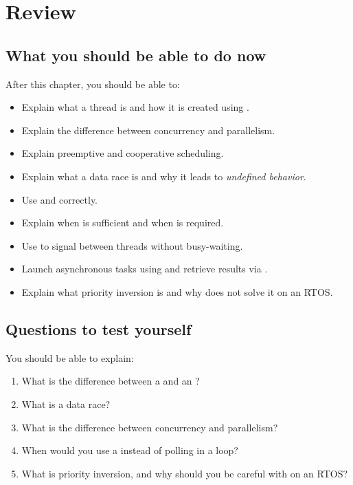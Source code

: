 
\section{Review}
\label{c6:sec:review}

\subsection*{What you should be able to do now}
After this chapter, you should be able to:
\begin{itemize}
  \item Explain what a thread is and how it is created using .
  \item Explain the difference between concurrency and parallelism.
  \item Explain preemptive and cooperative scheduling.
  \item Explain what a data race is and why it leads to \emph{undefined behavior}.
  \item Use  and  correctly.
  \item Explain when  is sufficient and when  is required.
  \item Use  to signal between threads without busy-waiting.
  \item Launch asynchronous tasks using  and retrieve results via
    .
  \item Explain what priority inversion is and why  does not solve it on an RTOS.
\end{itemize}

\subsection*{Questions to test yourself}
You should be able to explain:
\begin{enumerate}
  \item What is the difference between a  and an ?
  \item What is a data race?
  \item What is the difference between concurrency and parallelism?
  \item When would you use a  instead of polling in a loop?
  \item What is priority inversion, and why should you be careful with  on an
    RTOS?
\end{enumerate}

